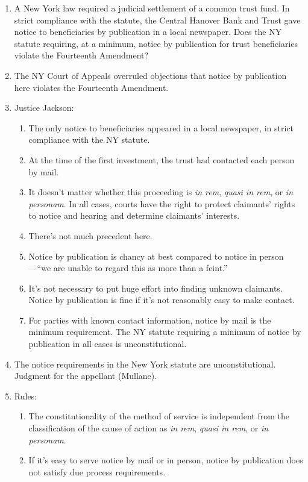 \begin{enumerate}
    \item A New York law required a judicial settlement of a common trust 
    fund.  In strict compliance with the statute, the Central Hanover Bank and 
    Trust gave notice to beneficiaries by publication in a local newspaper. 
    Does the NY statute requiring, at a minimum, notice by publication for 
    trust beneficiaries violate the Fourteenth Amendment?
    \item The NY Court of Appeals overruled objections that notice by 
    publication here violates the Fourteenth Amendment.
    \item Justice Jackson:
    \begin{enumerate}
        \item The only notice to beneficiaries appeared in a local newspaper, 
        in strict compliance with the NY statute.
        \item At the time of the first investment, the trust had contacted 
        each person by mail.
        \item It doesn't matter whether this proceeding is \emph{in rem}, 
        \emph{quasi in rem}, or \emph{in personam}. In all cases, courts have 
        the right to protect claimants' rights to notice and hearing and 
        determine claimants' interests.
        \item There's not much precedent here.
        \item Notice by publication is chancy at best compared to notice in 
        person---``we are unable to regard this as more than a feint.''
        \item It's not necessary to put huge effort into finding unknown 
        claimants. Notice by publication is fine if it's not reasonably easy 
        to make contact.
        \item For parties with known contact information, notice by mail is 
        the minimum requirement. The NY statute requiring a minimum of notice 
        by publication in all cases is unconstitutional.
    \end{enumerate}
    \item The notice requirements in the New York statute are 
    unconstitutional.  Judgment for the appellant (Mullane).
    \item Rules:
    \begin{enumerate}
       \item  The constitutionality of the method of service is independent 
       from the classification of the cause of action as \emph{in rem}, 
       \emph{quasi in rem}, or \emph{in personam}.
        \item If it's easy to serve notice by mail or in person, notice by 
        publication does not satisfy due process requirements.
    \end{enumerate}
\end{enumerate}

